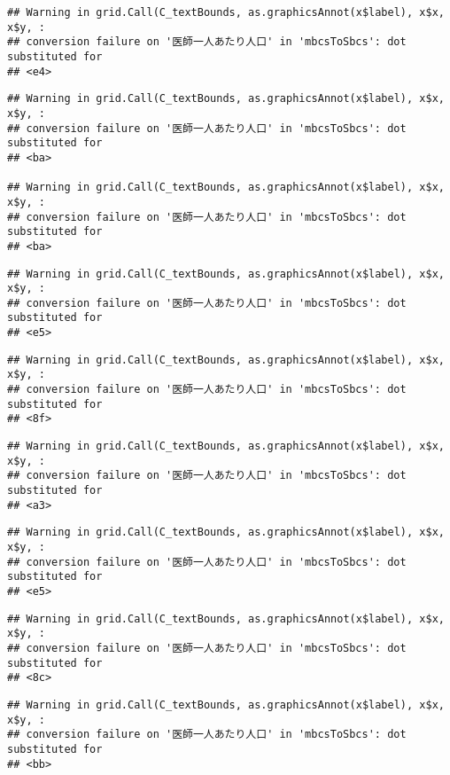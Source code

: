 \documentclass[
]{article}
\begin{document}
\begin{verbatim}
## Warning in grid.Call(C_textBounds, as.graphicsAnnot(x$label), x$x, x$y, :
## conversion failure on '医師一人あたり人口' in 'mbcsToSbcs': dot substituted for
## <e4>
\end{verbatim}

\begin{verbatim}
## Warning in grid.Call(C_textBounds, as.graphicsAnnot(x$label), x$x, x$y, :
## conversion failure on '医師一人あたり人口' in 'mbcsToSbcs': dot substituted for
## <ba>

## Warning in grid.Call(C_textBounds, as.graphicsAnnot(x$label), x$x, x$y, :
## conversion failure on '医師一人あたり人口' in 'mbcsToSbcs': dot substituted for
## <ba>
\end{verbatim}

\begin{verbatim}
## Warning in grid.Call(C_textBounds, as.graphicsAnnot(x$label), x$x, x$y, :
## conversion failure on '医師一人あたり人口' in 'mbcsToSbcs': dot substituted for
## <e5>
\end{verbatim}

\begin{verbatim}
## Warning in grid.Call(C_textBounds, as.graphicsAnnot(x$label), x$x, x$y, :
## conversion failure on '医師一人あたり人口' in 'mbcsToSbcs': dot substituted for
## <8f>
\end{verbatim}

\begin{verbatim}
## Warning in grid.Call(C_textBounds, as.graphicsAnnot(x$label), x$x, x$y, :
## conversion failure on '医師一人あたり人口' in 'mbcsToSbcs': dot substituted for
## <a3>
\end{verbatim}

\begin{verbatim}
## Warning in grid.Call(C_textBounds, as.graphicsAnnot(x$label), x$x, x$y, :
## conversion failure on '医師一人あたり人口' in 'mbcsToSbcs': dot substituted for
## <e5>
\end{verbatim}

\begin{verbatim}
## Warning in grid.Call(C_textBounds, as.graphicsAnnot(x$label), x$x, x$y, :
## conversion failure on '医師一人あたり人口' in 'mbcsToSbcs': dot substituted for
## <8c>
\end{verbatim}

\begin{verbatim}
## Warning in grid.Call(C_textBounds, as.graphicsAnnot(x$label), x$x, x$y, :
## conversion failure on '医師一人あたり人口' in 'mbcsToSbcs': dot substituted for
## <bb>
\end{verbatim}
\end{document}
